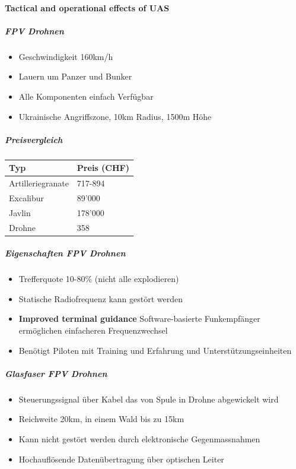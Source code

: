 {}\documentclass[a4paper]{article}
\providecommand{\tightlist}{\setlength{\itemsep}{1mm}\setlength{\parskip}{1mm}}
\begin{document}
\paragraph{Tactical and operational effects of
	UAS}\label{tactical-and-operational-effects-of-uas}

\subparagraph{FPV Drohnen}\label{fpv-drohnen}

\begin{itemize}
	\tightlist
	\item
	      Geschwindigkeit 160km/h
	\item
	      Lauern um Panzer und Bunker
	\item
	      Alle Komponenten einfach Verfügbar
	\item
	      Ukrainische Angriffszone, 10km Radius, 1500m Höhe
\end{itemize}

\subparagraph{Preisvergleich}\label{preisvergleich}

\begin{longtable}[]{@{}ll@{}}
	\toprule\noalign{}
	Typ               & Preis (CHF) \\
	\midrule\noalign{}
	\endhead
	\bottomrule\noalign{}
	\endlastfoot
	Artilleriegranate & 717-894     \\
	Excalibur         & 89'000      \\
	Javlin            & 178'000     \\
	Drohne            & 358         \\
\end{longtable}

\subparagraph{Eigenschaften FPV
	Drohnen}\label{eigenschaften-fpv-drohnen}

\begin{itemize}
	\tightlist
	\item
	      Trefferquote 10-80\% (nicht alle explodieren)
	\item
	      Statische Radiofrequenz kann gestört werden
	\item
	      \textbf{Improved terminal guidance} Software-basierte Funkempfänger
	      ermöglichen einfacheren Frequenzwechsel
	\item
	      Benötigt Piloten mit Training und Erfahrung und
	      Unterstützungseinheiten
\end{itemize}

\subparagraph{Glasfaser FPV Drohnen}\label{glasfaser-fpv-drohnen}

\begin{itemize}
	\tightlist
	\item
	      Steuerungssignal über Kabel das von Spule in Drohne abgewickelt wird
	\item
	      Reichweite 20km, in einem Wald bis zu 15km
	\item
	      Kann nicht gestört werden durch elektronische Gegenmassnahmen
	\item
	      Hochauflösende Datenübertragung über optischen Leiter
\end{itemize}
\end{document}
